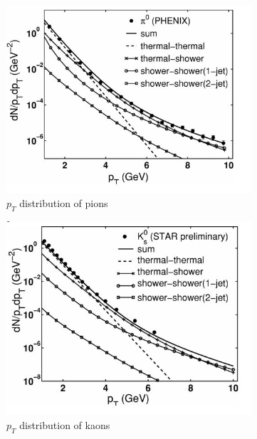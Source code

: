 \begin{figure}
\centering
\begin{subfigure}[b]{0.32\textwidth}
    \centering
    \includegraphics[width=\textwidth]{prevplots/piyieldrecomb.JPG}
    \caption{$p_T$ distribution of pions}
    \label{fig:kyieldrecomb}
\end{subfigure}
\begin{subfigure}[b]{0.32\textwidth}
    \centering
    \includegraphics[width=\textwidth]{prevplots/kyieldrecomb.JPG}
    \caption{$p_T$ distribution of kaons}
    \label{fig:kyieldrecomb}
\end{subfigure}
\begin{subfigure}[b]{0.32\textwidth}

\end{subfigure}
\end{figure}
